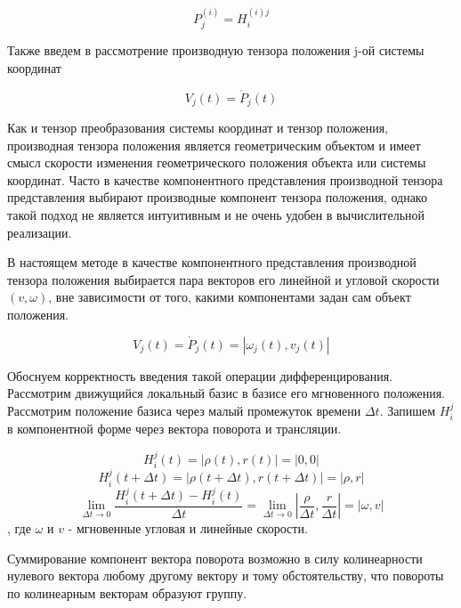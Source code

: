 \begin{equation}
P_j^{(i)} = H_{i}^{(i)j}
\end{equation}

Также введем в рассмотрение производную тензора положения j-ой системы координат

\begin{equation}\label{speed_eq} 
V_j(t) = \dot{P}_j(t) 
\end{equation}

Как и тензор преобразования системы координат и тензор положения, производная тензора положения является геометрическим объектом и имеет смысл скорости изменения геометрического положения объекта или системы координат. Часто в качестве компонентного представления производной тензора представления выбирают производные компонент тензора положения, однако такой подход не является интуитивным и не очень удобен в вычислительной реализации.

В настоящем методе в качестве компонентного представления производной тензора положения выбирается пара векторов его линейной и угловой скорости $(v,\omega)$, вне зависимости от того, какими компонентами задан сам объект положения.

\begin{equation}\label{speed_eq_comp} 
V_j(t) = \dot{P}_j(t) = |\omega_j(t),v_j(t)|
\end{equation} 

Обоснуем корректность введения такой операции дифференцирования. Рассмотрим движущийся локальный базис в базисе его мгновенного положения. Рассмотрим положение базиса через малый промежуток времени $\Delta t$. Запишем $H^j_i$ в компонентной форме через вектора поворота и трансляции.

\begin{equation}H^j_i(t) = |\rho(t), r(t)| = |0, 0|\end{equation} 
\begin{equation}H^j_i(t+\Delta t) = |\rho(t + \Delta t), r(t + \Delta t)| = |\rho, r|\end{equation} 
\begin{equation}\lim_{\Delta t \to 0}\frac{H^j_i(t+\Delta t) - H^j_i(t)}{\Delta t} = \lim_{\Delta t \to 0}|\frac{\rho}{\Delta t}, \frac{r}{\Delta t}| = |\omega, v|\end{equation} , где $\omega$ и $v$ - мгновенные угловая и линейные скорости.

Суммирование компонент вектора поворота возможно в силу колинеарности нулевого вектора любому другому вектору и тому обстоятельству, что повороты по колинеарным векторам образуют группу.

